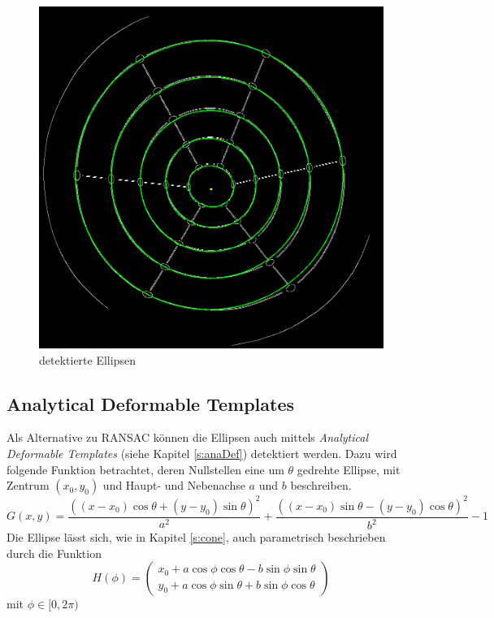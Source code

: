 \begin{figure}[!htb]
	\centering
	\includegraphics[scale=.25]{images/detectedEllipses.png}
	\caption{detektierte Ellipsen}
	\label{fig:detectedEllipses}
\end{figure}


\subsection{Analytical Deformable Templates}

Als Alternative zu RANSAC können die Ellipsen auch mittels \textit{Analytical Deformable Templates} (siehe Kapitel \ref{s:anaDef}) detektiert werden. Dazu wird folgende Funktion betrachtet, deren Nullstellen eine um $\theta$ gedrehte Ellipse, mit Zentrum $(x_0,y_0)$ und Haupt- und Nebenachse $a$ und $b$ beschreiben.
\[
	G(x,y) = \frac{((x - x_0)\cos\theta + (y - y_0)\sin\theta)^2}{a^2} + \frac{((x - x_0)\sin\theta - (y - y_0)\cos\theta)^2}{b^2} - 1
\] %
Die Ellipse lässt sich, wie in Kapitel \ref{s:cone}, auch parametrisch beschrieben durch die Funktion
\[
H(\phi) = \begin{pmatrix}x_0 + a\cos\phi\cos\theta - b\sin\phi\sin\theta \\
y_0 + a\cos\phi\sin\theta + b\sin\phi\cos\theta\end{pmatrix}
\] %
mit $\phi \in [0,2\pi)$

